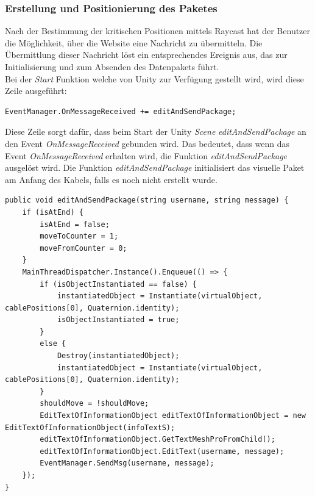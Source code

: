 \begin{itemize}
    \subsubsection{Erstellung und Positionierung des Paketes}\label{sec:PaketPos}
    Nach der Bestimmung der kritischen Positionen mittels Raycast hat der Benutzer die Möglichkeit, über die Website eine Nachricht zu übermitteln. Die Übermittlung dieser Nachricht löst ein entsprechendes Ereignis aus, das zur Initialisierung und zum Absenden des Datenpakets führt.\\
    Bei der \textit{Start} Funktion welche von Unity zur Verfügung gestellt  wird, wird diese Zeile ausgeführt:
    \begin{lstlisting}[style=csharp, caption={Binden an der Methode}, label=code:]
EventManager.OnMessageReceived += editAndSendPackage;
    \end{lstlisting}
    Diese Zeile sorgt dafür, dass beim Start der Unity \textit{Scene} \textit{editAndSendPackage} an den Event \textit{OnMessageReceived} gebunden wird. Das bedeutet, dass wenn das Event \textit{OnMessageReceived} erhalten wird, die Funktion \textit{editAndSendPackage} ausgelöst wird.
    Die Funktion \textit{editAndSendPackage} initialisiert das visuelle Paket am Anfang des Kabels, falls es noch nicht erstellt wurde.
    \begin{lstlisting}[style=csharp, caption={Initialisierung und Bearbeitung des Paketes}, label=code:editAndSendPackage]
public void editAndSendPackage(string username, string message) {
    if (isAtEnd) {
        isAtEnd = false;
        moveToCounter = 1;
        moveFromCounter = 0;
    }
    MainThreadDispatcher.Instance().Enqueue(() => {
        if (isObjectInstantiated == false) {
            instantiatedObject = Instantiate(virtualObject, cablePositions[0], Quaternion.identity);
            isObjectInstantiated = true;
        }
        else {
            Destroy(instantiatedObject);
            instantiatedObject = Instantiate(virtualObject, cablePositions[0], Quaternion.identity);
        }
        shouldMove = !shouldMove;
        EditTextOfInformationObject editTextOfInformationObject = new EditTextOfInformationObject(infoTextS);
        editTextOfInformationObject.GetTextMeshProFromChild();
        editTextOfInformationObject.EditText(username, message);
        EventManager.SendMsg(username, message);
    });
}
    \end{lstlisting}

\end{itemize}

